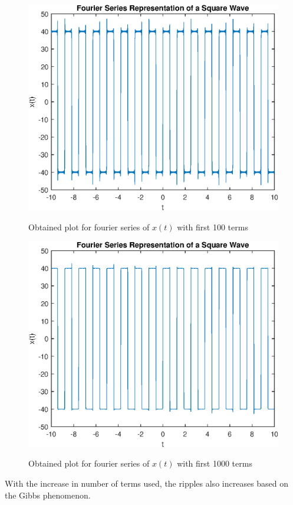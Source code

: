 \documentclass{lab_sheet}
\begin{document}
    \begin{figure}[H]
        \centering
        \includegraphics[scale=0.7]{./Figures/sin_add_odd_2}
        \label{fig:sin2}
        \caption{Obtained plot for fourier series of $x(t)$ with first 100 terms}
    \end{figure}

    \begin{figure}[H]
        \centering
        \includegraphics[scale=0.7]{./Figures/sin_add_odd_3}
        \label{fig:sin3}
        \caption{Obtained plot for fourier series of $x(t)$ with first 1000 terms}
    \end{figure}
    With the increase in number of terms used, the ripples also increases based on the Gibbs phenomenon.
\end{document}
